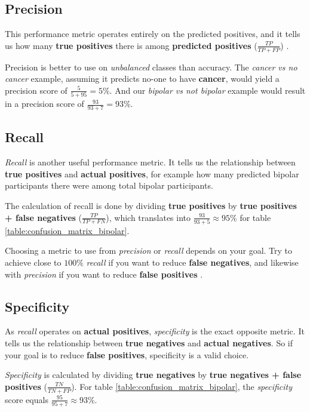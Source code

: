 \subsection{Precision}

This performance metric operates entirely on the predicted positives, and it tells us how many \textbf{true positives} there is among 
\textbf{predicted positives} ($ \frac{TP}{TP + FP} $) \cite{ml_metrics}. 

Precision is better to use on \textit{unbalanced} classes than accuracy. The \textit{cancer vs no cancer} example, assuming it 
predicts no-one to have \textbf{cancer}, would yield a precision score of $ \frac{5}{5+95} = 5\% $. And our \textit{bipolar vs not bipolar} example
would result in a precision score of $ \frac{93}{93+7} = 93\% $.

\subsection{Recall}

\textit{Recall} is another useful performance metric. It tells us the relationship between \textbf{true positives} and \textbf{actual positives},
for example how many predicted bipolar participants there were among total bipolar participants.

The calculation of recall is done by dividing \textbf{true positives} by \textbf{true positives + false negatives} ($ \frac{TP}{TP+FN} $), 
which translates into $ \frac{93}{93+5} \approx 95\% $ for table \ref{table:confusion_matrix_bipolar}.

Choosing a metric to use from \textit{precision} or \textit{recall} depends on your goal. Try to achieve close to $ 100\% $ \textit{recall} 
if you want to reduce \textbf{false negatives}, and likewise with \textit{precision} if you want to reduce \textbf{false positives} \cite{ml_metrics}.

\subsection{Specificity}

As \textit{recall} operates on \textbf{actual positives}, \textit{specificity} is the exact opposite metric. It tells us the relationship between
\textbf{true negatives} and \textbf{actual negatives}. So if your goal is to reduce \textbf{false positives}, specificity is a valid choice.

\textit{Specificity} is calculated by dividing \textbf{true negatives} by \textbf{true negatives + false positives} ($ \frac{TN}{TN+FP} $). 
For table \ref{table:confusion_matrix_bipolar}, the \textit{specificity} score equals $ \frac{95}{95+7} \approx 93\% $.

